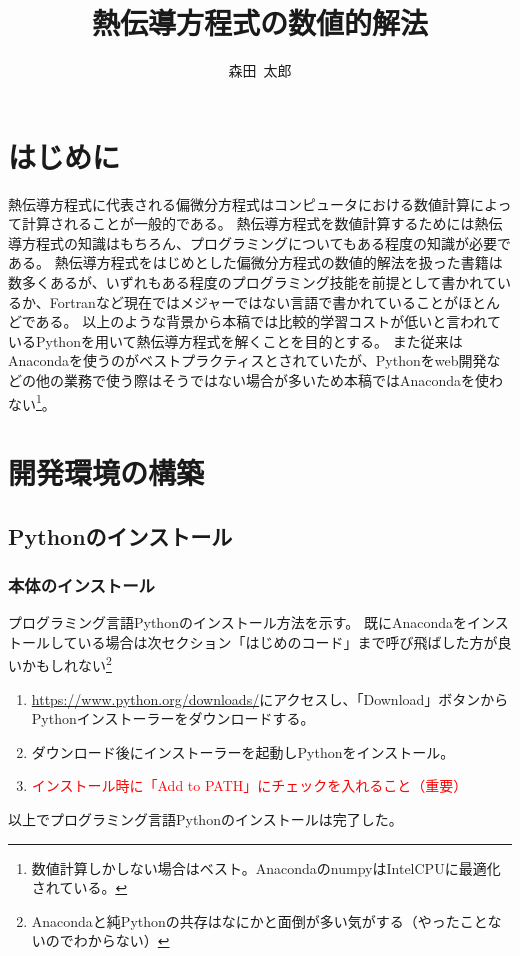 \documentclass[]{ltjsbook}
\title{熱伝導方程式の数値的解法}
\author{森田~太郎}
\date{}
\begin{document}
	\maketitle
	
	\tableofcontents
	
	\chapter{はじめに}
	熱伝導方程式に代表される偏微分方程式はコンピュータにおける数値計算によって計算されることが一般的である。
	熱伝導方程式を数値計算するためには熱伝導方程式の知識はもちろん、プログラミングについてもある程度の知識が必要である。
	熱伝導方程式をはじめとした偏微分方程式の数値的解法を扱った書籍は数多くあるが、いずれもある程度のプログラミング技能を前提として書かれているか、Fortranなど現在ではメジャーではない言語で書かれていることがほとんどである。
	以上のような背景から本稿では比較的学習コストが低いと言われているPythonを用いて熱伝導方程式を解くことを目的とする。
	また従来はAnacondaを使うのがベストプラクティスとされていたが、Pythonをweb開発などの他の業務で使う際はそうではない場合が多いため本稿ではAnacondaを使わない\footnote{数値計算しかしない場合はベスト。AnacondaのnumpyはIntelCPUに最適化されている。}。
	
	\chapter{開発環境の構築}
	\section{Pythonのインストール}
	\subsection{本体のインストール}
	プログラミング言語Pythonのインストール方法を示す。
	既にAnacondaをインストールしている場合は次セクション「はじめのコード」まで呼び飛ばした方が良いかもしれない\footnote{Anacondaと純Pythonの共存はなにかと面倒が多い気がする（やったことないのでわからない）}
	\begin{enumerate}
		\item \url{https://www.python.org/downloads/}にアクセスし、「Download」ボタンからPythonインストーラーをダウンロードする。
		\item ダウンロード後にインストーラーを起動しPythonをインストール。
		\item \textcolor{red}{インストール時に「Add to PATH」にチェックを入れること（重要）}
	\end{enumerate}
	以上でプログラミング言語Pythonのインストールは完了した。
\end{document}
